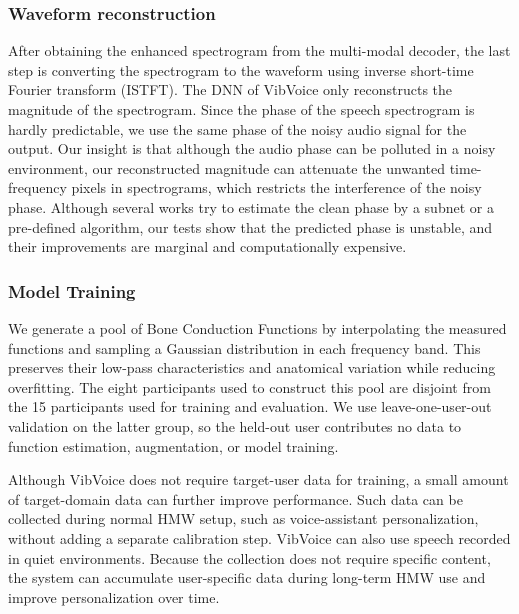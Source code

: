 \subsubsection{\textbf{Waveform reconstruction}}
After obtaining the enhanced spectrogram from the multi-modal decoder, the last step is converting the spectrogram to the waveform using inverse short-time Fourier transform (ISTFT). The DNN of VibVoice only reconstructs the magnitude of the spectrogram. Since the phase of the speech spectrogram is hardly predictable, we use the same phase of the noisy audio signal for the output. Our insight is that although the audio phase can be polluted in a noisy environment, our reconstructed magnitude can attenuate the unwanted time-frequency pixels in spectrograms, which restricts the interference of the noisy phase. Although several works \citep{sun2021ultrase,zhang2021sensing} try to estimate the clean phase by a subnet or a pre-defined algorithm, our tests show that the predicted phase is unstable, and their improvements are marginal and computationally expensive.

\subsubsection{\textbf{Model Training}}
\label{sec:vibvoice_training}
We generate a pool of Bone Conduction Functions by interpolating the measured functions and sampling a Gaussian distribution in each frequency band. This preserves their low-pass characteristics and anatomical variation while reducing overfitting. The eight participants used to construct this pool are disjoint from the 15 participants used for training and evaluation. We use leave-one-user-out validation on the latter group, so the held-out user contributes no data to function estimation, augmentation, or model training.

Although VibVoice does not require target-user data for training, a small amount of target-domain data can further improve performance. Such data can be collected during normal HMW setup, such as voice-assistant personalization, without adding a separate calibration step. VibVoice can also use speech recorded in quiet environments. Because the collection does not require specific content, the system can accumulate user-specific data during long-term HMW use and improve personalization over time.


